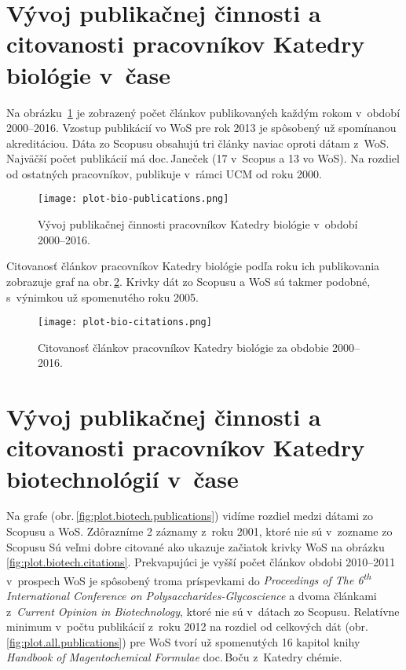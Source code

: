 \section{Vývoj publikačnej činnosti a citovanosti pracovníkov Katedry biológie
  v~čase}

Na obrázku~\ref{fig:plot.bio.publications} je zobrazený počet článkov
publikovaných každým rokom v~období 2000--2016.  Vzostup publikácií vo WoS pre
rok 2013 je spôsobený už spomínanou akreditáciou.  Dáta zo Scopusu obsahujú tri
články naviac oproti dátam z~WoS.  Najväčší počet publikácií má doc.\,Janeček
(17 v~Scopus a 13 vo WoS).  Na rozdiel od ostatných pracovníkov, publikuje
v~rámci UCM od roku 2000.

\begin{figure}
  \centering
  \texttt{[image: plot-bio-publications.png]}
  \caption{Vývoj publikačnej činnosti pracovníkov Katedry biológie v~období
    2000--2016.}
  \label{fig:plot.bio.publications}
\end{figure}

Citovanosť článkov pracovníkov Katedry biológie podľa roku ich publikovania
zobrazuje graf na obr.\,\ref{fig:plot.bio.citations}.  Krivky dát zo Scopusu a
WoS sú takmer podobné, s~výnimkou už spomenutého  roku 2005.

\begin{figure}
  \centering
  \texttt{[image: plot-bio-citations.png]}
  \caption{Citovanosť článkov pracovníkov Katedry biológie za obdobie
    2000--2016.}
  \label{fig:plot.bio.citations}
\end{figure}


\section{Vývoj publikačnej činnosti a citovanosti pracovníkov Katedry
  biotechnológií v~čase}

Na grafe (obr.\,\ref{fig:plot.biotech.publications}) vidíme rozdiel medzi dátami
zo Scopusu a WoS.  Zdôrazníme 2 záznamy z~roku 2001, ktoré nie sú v~zozname zo
Scopusu Sú veľmi dobre citované ako ukazuje začiatok krivky WoS na obrázku
\ref{fig:plot.biotech.citations}.  Prekvapujúci je vyšší počet článkov obdobi
2010--2011 v~prospech WoS je spôsobený troma príspevkami do \emph{Proceedings of
  The 6\textsuperscript{th} International Conference on
  Polysaccharides-Glycoscience} a dvoma článkami z~\emph{Current Opinion in
  Biotechnology}, ktoré nie sú v~dátach zo Scopusu.  Relatívne minimum v~počtu
publikácií z~roku 2012 na rozdiel od celkových dát
(obr.\,\ref{fig:plot.all.publications}) pre WoS tvorí už spomenutých 16 kapitol
knihy \emph{Handbook of Magentochemical Formulae} doc.\,Boču z~Katedry chémie.

